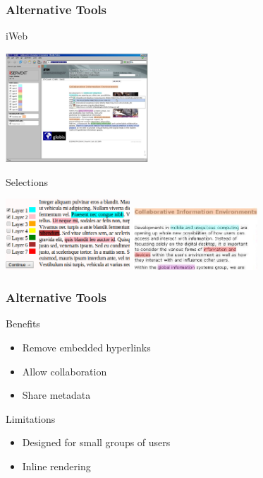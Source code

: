 \begin{frame}
	\frametitle{Alternative Tools}
	\begin{block}{iWeb}
		\begin{center}
			\includegraphics[width=0.4\textwidth]{./images/iWeb.png}
		\end{center}
	\end{block}
	\begin{block}{Selections}
		\begin{center}
			\includegraphics[width=0.35\textwidth]{./images/layers.png}\hspace{0.1cm}
			\includegraphics[width=0.35\textwidth]{./images/iWebSelection.png}
		\end{center}
	\end{block}
\end{frame}
\begin{frame}
	\frametitle{Alternative Tools}
	\begin{block}{Benefits}
		\begin{itemize}
			\item Remove embedded hyperlinks
			\item Allow collaboration
			\item Share metadata
		\end{itemize}
	\end{block}
	\begin{block}{Limitations}
		\begin{itemize}
			\item Designed for small groups of users
			\item Inline rendering
		\end{itemize}
	\end{block}
\end{frame}
